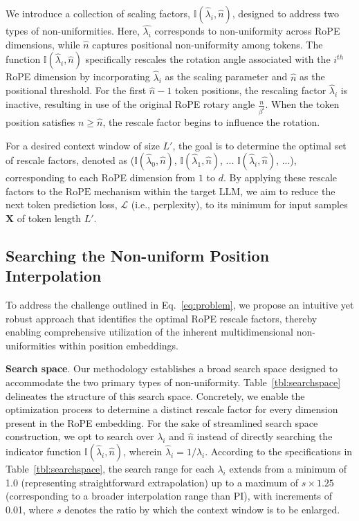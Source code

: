 We introduce a collection of scaling factors, $\mathbb{I}(\hat{\lambda}_{i},\hat{n})$, designed to address two types of non-uniformities. Here, $\hat{\lambda_i}$ corresponds to non-uniformity across RoPE dimensions, while $\hat{n}$ captures positional non-uniformity among tokens. The function $\mathbb{I}(\hat{\lambda}_{i},\hat{n})$ specifically rescales the rotation angle associated with the $i^{th}$ RoPE dimension by incorporating $\hat\lambda_{i}$ as the scaling parameter and $\hat{n}$ as the positional threshold. For the first $\hat{n}-1$ token positions, the rescaling factor $\hat\lambda_{i}$ is inactive, resulting in use of the original RoPE rotary angle $\frac{n}{\beta^i}$. When the token position satisfies $n\ge\hat{n}$, the rescale factor begins to influence the rotation.

For a desired context window of size $L'$, the goal is to determine the optimal set of rescale factors, denoted as ($\mathbb{I}(\hat{\lambda}_{0},\hat{n})$, $\mathbb{I}(\hat{\lambda}_{1},\hat{n})$, ... $\mathbb{I}(\hat{\lambda}_{i},\hat{n})$, ...), corresponding to each RoPE dimension from $1$ to $d$. By applying these rescale factors to the $\text{RoPE}$ mechanism within the target $\text{LLM}$, we aim to reduce the next token prediction loss, $\mathcal{L}$ (i.e., perplexity), to its minimum for input samples $\mathbf{X}$ of token length $L'$.

\subsection{Searching the Non-uniform Position Interpolation}

To address the challenge outlined in Eq.~\ref{eq:problem}, we propose an intuitive yet robust approach that identifies the optimal RoPE rescale factors, thereby enabling comprehensive utilization of the inherent multidimensional non-uniformities within position embeddings.

\textbf{Search space}. Our methodology establishes a broad search space designed to accommodate the two primary types of non-uniformity. Table~\ref{tbl:searchspace} delineates the structure of this search space. Concretely, we enable the optimization process to determine a distinct rescale factor for every dimension present in the RoPE embedding. For the sake of streamlined search space construction, we opt to search over $\lambda_i$ and $\hat{n}$ instead of directly searching the indicator function $\mathbb{I}(\hat{\lambda}_{i},\hat{n})$, wherein $\hat{\lambda}_{i}=1/\lambda_i$. According to the specifications in Table~\ref{tbl:searchspace}, the search range for each $\lambda_i$ extends from a minimum of 1.0 (representing straightforward extrapolation) up to a maximum of $s\times1.25$ (corresponding to a broader interpolation range than PI), with increments of 0.01, where $s$ denotes the ratio by which the context window is to be enlarged.

